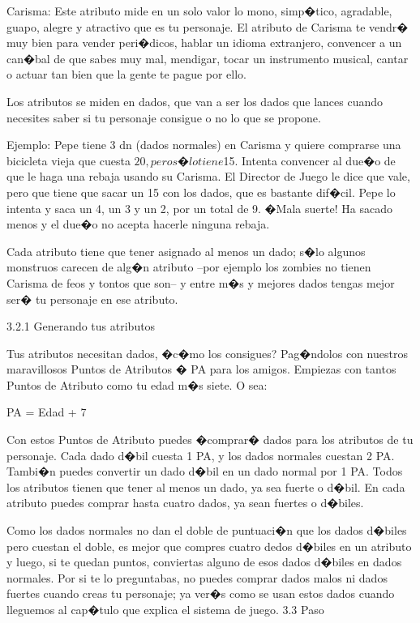 Carisma:
Este atributo mide en un solo valor lo mono, simp�tico, agradable, guapo, alegre y atractivo que es tu personaje. El atributo de Carisma te vendr� muy bien para vender peri�dicos, hablar un idioma extranjero, convencer a un can�bal de que sabes muy mal, mendigar, tocar un instrumento musical, cantar o actuar tan bien que la gente te pague por ello.


Los atributos se miden en dados, que van a ser los dados que lances cuando necesites saber si tu personaje consigue o no lo que se propone. 


Ejemplo: Pepe tiene 3 dn (dados normales) en Carisma y quiere comprarse una bicicleta vieja que cuesta $20, pero s�lo tiene $15. Intenta convencer al due�o de que le haga una rebaja usando su Carisma. El Director de Juego le dice que vale, pero que tiene que sacar un 15 con los dados, que es bastante dif�cil. Pepe lo intenta y saca un 4, un 3 y un 2, por un total de 9. �Mala suerte! Ha sacado menos y el due�o no acepta hacerle ninguna rebaja.


Cada atributo tiene que tener asignado al menos un dado; s�lo algunos monstruos carecen de alg�n atributo --por ejemplo los zombies no tienen Carisma de feos y tontos que son-- y entre m�s y mejores dados tengas mejor ser� tu personaje en ese atributo.


3.2.1 Generando tus atributos


Tus atributos necesitan dados, �c�mo los consigues? Pag�ndolos con nuestros maravillosos Puntos de Atributos � PA para los amigos. Empiezas con tantos Puntos de Atributo como tu edad m�s siete. O sea:


PA = Edad + 7


Con estos Puntos de Atributo puedes �comprar� dados para los atributos de tu personaje. Cada dado d�bil cuesta 1 PA, y los dados normales cuestan 2 PA. Tambi�n puedes convertir un dado d�bil en un dado normal por 1 PA.
Todos los atributos tienen que tener al menos un dado, ya sea fuerte o d�bil. En cada atributo puedes comprar hasta cuatro dados, ya sean fuertes o d�biles.


Como los dados normales no dan el doble de puntuaci�n que los dados d�biles pero cuestan el doble, es mejor que compres cuatro dedos d�biles en un atributo y luego, si te quedan puntos, conviertas alguno de esos dados d�biles en dados normales.
Por si te lo preguntabas, no puedes comprar dados malos ni dados fuertes cuando creas tu personaje; ya ver�s como se usan estos dados cuando lleguemos al cap�tulo que explica el sistema de juego.
3.3 Paso


